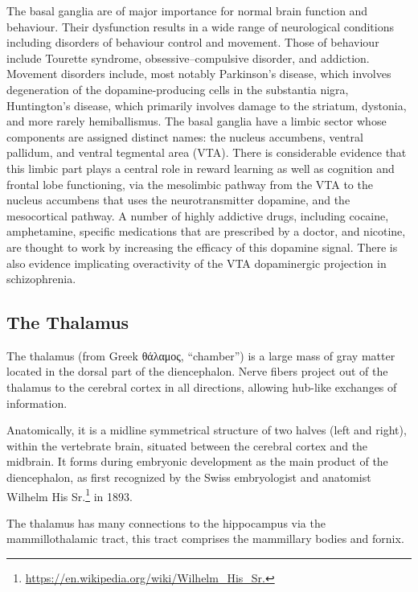 \documentclass[]{book}
\let\rmarkdownfootnote\footnote%
\def\footnote{\protect\rmarkdownfootnote}
\renewcommand{\href}[2]{#2\footnote{\url{#1}}}
\begin{document}
The basal ganglia are of major importance for normal brain function and behaviour. Their dysfunction results in a wide range of neurological conditions including disorders of behaviour control and movement. Those of behaviour include Tourette syndrome, obsessive--compulsive disorder, and addiction. Movement disorders include, most notably Parkinson's disease, which involves degeneration of the dopamine-producing cells in the substantia nigra, Huntington's disease, which primarily involves damage to the striatum, dystonia, and more rarely hemiballismus. The basal ganglia have a limbic sector whose components are assigned distinct names: the nucleus accumbens, ventral pallidum, and ventral tegmental area (VTA). There is considerable evidence that this limbic part plays a central role in reward learning as well as cognition and frontal lobe functioning, via the mesolimbic pathway from the VTA to the nucleus accumbens that uses the neurotransmitter dopamine, and the mesocortical pathway. A number of highly addictive drugs, including cocaine, amphetamine, specific medications that are prescribed by a doctor, and nicotine, are thought to work by increasing the efficacy of this dopamine signal. There is also evidence implicating overactivity of the VTA dopaminergic projection in schizophrenia.

\hypertarget{the-thalamus}{%
\subsection{The Thalamus}\label{the-thalamus}}

The thalamus (from Greek θάλαμος, ``chamber'') is a large mass of gray matter located in the dorsal part of the diencephalon. Nerve fibers project out of the thalamus to the cerebral cortex in all directions, allowing hub-like exchanges of information.

Anatomically, it is a midline symmetrical structure of two halves (left and right), within the vertebrate brain, situated between the cerebral cortex and the midbrain. It forms during embryonic development as the main product of the diencephalon, as first recognized by the Swiss embryologist and anatomist \href{https://en.wikipedia.org/wiki/Wilhelm_His_Sr.}{Wilhelm His Sr.} in 1893.

The thalamus has many connections to the hippocampus via the mammillothalamic tract, this tract comprises the mammillary bodies and fornix.
\end{document}
